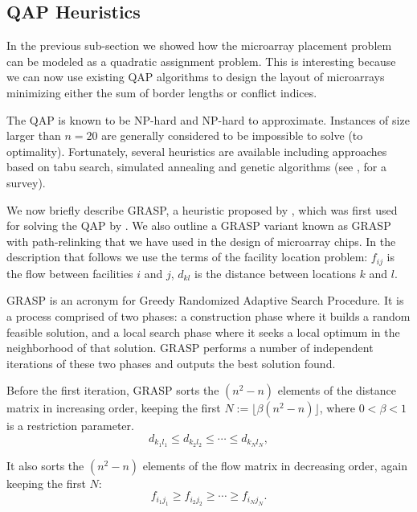 \documentclass[english]{lni}
\begin{document}
\subsection{QAP Heuristics}

In the previous sub-section we showed how the microarray placement problem can
be modeled as a quadratic assignment problem. This is interesting because we can
now use existing QAP algorithms to design the layout of microarrays minimizing
either the sum of border lengths or conflict indices. 

The QAP is known to be NP-hard and NP-hard to approximate. Instances of size
larger than $n = 20$ are generally considered to be impossible to solve (to
optimality). Fortunately, several heuristics are available including
approaches based on tabu search, simulated annealing and genetic algorithms
(see \cite{CELA98}, for a survey).

We now briefly describe GRASP, a heuristic proposed by \cite{FEO95}, which
was first used for solving the QAP by \cite{LI94}. We also outline a GRASP
variant known as GRASP with path-relinking \cite{OLIVEIRA04} that we have
used in the design of microarray chips. In the description that follows we use
the terms of the facility location problem: $f_{ij}$ is the flow between
facilities $i$ and $j$, $d_{kl}$ is the distance between locations $k$ and
$l$.

GRASP is an acronym for Greedy Randomized Adaptive Search Procedure. It is a
process comprised of two phases: a construction phase where it builds a random
feasible solution, and a local search phase where it seeks a local optimum in
the neighborhood of that solution. GRASP performs a number of independent
iterations of these two phases and outputs the best solution found.

Before the first iteration, GRASP sorts the $(n^2 - n)$ elements of the
distance matrix in increasing order, keeping the first $N:= \lfloor \beta (n^2 -
n) \rfloor$, where $0 < \beta < 1$ is a restriction parameter.
\begin{displaymath}
d_{k_1 l_1} \le d_{k_2 l_2} \le \cdots \le d_{k_N l_N},
\end{displaymath}

It also sorts the $(n^2 - n)$ elements of the flow matrix in decreasing order,
again keeping the first $N$:
\begin{displaymath}
f_{i_1 j_1} \ge f_{i_2 j_2} \ge \cdots \ge f_{i_N j_N}.
\end{displaymath}
\end{document}
